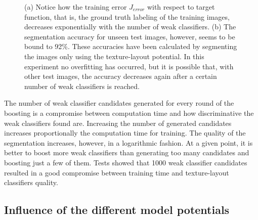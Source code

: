 \begin{figure}[htb]
\caption[Influence of number of weak classifiers on segmentation accuracy]{(a) Notice how the training error $J_{error}$ with respect to target function, that is, the ground truth labeling of the training images, decreases exponentially with the number of weak classifiers. (b) The segmentation accuracy for unseen test images, however, seems to be bound to 92\%. These accuracies have been calculated by segmenting the images only using the texture-layout potential. In this experiment no overfitting has occurred, but it is possible that, with other test images, the accuracy decreases again after a certain number of weak classifiers is reached.}
\label{fig:segmentation_quality_x_weak_classifiers}
\end{figure}

The number of weak classifier candidates generated for every round of the boosting is a compromise between computation time and how discriminative the weak classifiers found are. Increasing the number of generated candidates increases proportionally the computation time for training. The quality of the segmentation increases, however, in a logarithmic fashion. At a given point, it is better to boost more weak classifiers than generating too many candidates and boosting just a few of them. Tests showed that 1000 weak classifier candidates resulted in a good compromise between training time and texture-layout classifiers quality.

\subsection{Influence of the different model potentials}

